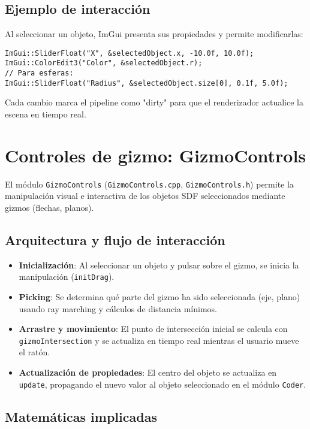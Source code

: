 \subsection{Ejemplo de interacción}

Al seleccionar un objeto, ImGui presenta sus propiedades y permite
modificarlas:
\begin{verbatim}
ImGui::SliderFloat("X", &selectedObject.x, -10.0f, 10.0f);
ImGui::ColorEdit3("Color", &selectedObject.r);
// Para esferas:
ImGui::SliderFloat("Radius", &selectedObject.size[0], 0.1f, 5.0f);
\end{verbatim}
Cada cambio marca el pipeline como "dirty" para que el renderizador actualice
la escena en tiempo real.

\section{Controles de gizmo: GizmoControls}

El módulo \texttt{GizmoControls} (\texttt{GizmoControls.cpp},
\texttt{GizmoControls.h}) permite la manipulación visual e interactiva de los
objetos SDF seleccionados mediante gizmos (flechas, planos).

\subsection{Arquitectura y flujo de interacción}

\begin{itemize}
    \item \textbf{Inicialización}: Al seleccionar un objeto y pulsar sobre el gizmo, se inicia la manipulación (\texttt{initDrag}).
    \item \textbf{Picking}: Se determina qué parte del gizmo ha sido seleccionada (eje, plano) usando ray marching y cálculos de distancia mínimos.
    \item \textbf{Arrastre y movimiento}: El punto de intersección inicial se calcula con \texttt{gizmoIntersection} y se actualiza en tiempo real mientras el usuario mueve el ratón.
    \item \textbf{Actualización de propiedades}: El centro del objeto se actualiza en \texttt{update}, propagando el nuevo valor al objeto seleccionado en el módulo \texttt{Coder}.
\end{itemize}

\subsection{Matemáticas implicadas}

